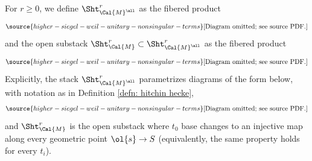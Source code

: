 \begin{defn}
\notready\label{defn: hitchin shtuka}
For $r \geq 0$, we define $\Sht_{\Cal{M}^{\all}}^{r}$ as the fibered product
\begin{equation}\label{eq: shtuka all as intersection}
\source{higher-siegel-weil-unitary-nonsingular-terms}
\text{[Diagram omitted; see source PDF.]}
\end{equation}
and the open substack $\Sht_{\Cal{M}}^{r} \subset \Sht_{\Cal{M}^{\all}}^{r}$ as the fibered product
\begin{equation}\label{eq: shtuka as intersection}
\source{higher-siegel-weil-unitary-nonsingular-terms}
\text{[Diagram omitted; see source PDF.]}
\end{equation}
Explicitly, the stack $\Sht_{\Cal{M}^{\all}}^{r}$ parametrizes diagrams of the form below, with notation as in Definition \ref{defn: hitchin hecke},
\begin{equation}\label{eq: sht_M point}
\source{higher-siegel-weil-unitary-nonsingular-terms}
\text{[Diagram omitted; see source PDF.]}
\end{equation}
and $\Sht_{\Cal{M}}^{r}$ is the open substack where $t_0$ base changes to an injective map along every geometric point $\ol{s} \rightarrow S$ (equivalently, the same property holds for every $t_i$).

\end{defn}



